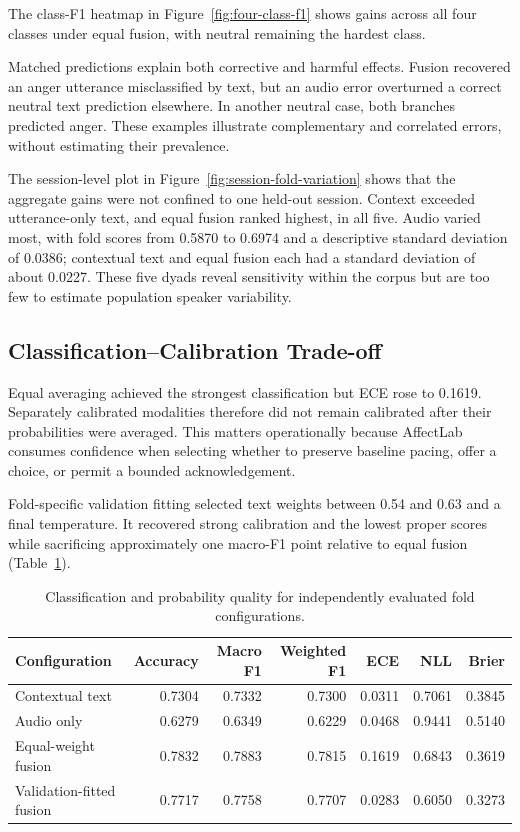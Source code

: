 The class-F1 heatmap in Figure~\ref{fig:four-class-f1} shows gains across all four classes under equal fusion, with neutral remaining the hardest class.

Matched predictions explain both corrective and harmful effects. Fusion recovered an anger utterance misclassified by text, but an audio error overturned a correct neutral text prediction elsewhere. In another neutral case, both branches predicted anger. These examples illustrate complementary and correlated errors, without estimating their prevalence.

The session-level plot in Figure~\ref{fig:session-fold-variation} shows that the aggregate gains were not confined to one held-out session. Context exceeded utterance-only text, and equal fusion ranked highest, in all five. Audio varied most, with fold scores from 0.5870 to 0.6974 and a descriptive standard deviation of 0.0386; contextual text and equal fusion each had a standard deviation of about 0.0227. These five dyads reveal sensitivity within the corpus but are too few to estimate population speaker variability.

\subsection{Classification--Calibration Trade-off}
\label{subsec:fusion-calibration-results}

Equal averaging achieved the strongest classification but ECE rose to 0.1619. Separately calibrated modalities therefore did not remain calibrated after their probabilities were averaged. This matters operationally because AffectLab consumes confidence when selecting whether to preserve baseline pacing, offer a choice, or permit a bounded acknowledgement.

Fold-specific validation fitting selected text weights between 0.54 and 0.63 and a final temperature. It recovered strong calibration and the lowest proper scores while sacrificing approximately one macro-F1 point relative to equal fusion (Table~\ref{tab:calibration-tradeoff}).

\begin{table}[htbp]
\centering
\caption{Classification and probability quality for independently evaluated fold configurations.}
\label{tab:calibration-tradeoff}
\scriptsize
\setlength{\tabcolsep}{3pt}
\begin{tabular}{|l|r|r|r|r|r|r|}
\hline
\textbf{Configuration} & \textbf{Accuracy} & \textbf{Macro F1} & \textbf{Weighted F1} & \textbf{ECE} & \textbf{NLL} & \textbf{Brier} \\ \hline
Contextual text & 0.7304 & 0.7332 & 0.7300 & 0.0311 & 0.7061 & 0.3845 \\ \hline
Audio only & 0.6279 & 0.6349 & 0.6229 & 0.0468 & 0.9441 & 0.5140 \\ \hline
Equal-weight fusion & 0.7832 & 0.7883 & 0.7815 & 0.1619 & 0.6843 & 0.3619 \\ \hline
Validation-fitted fusion & 0.7717 & 0.7758 & 0.7707 & 0.0283 & 0.6050 & 0.3273 \\ \hline
\end{tabular}
\end{table}

